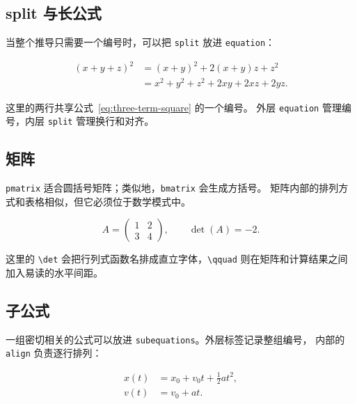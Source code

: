 \subsection{split 与长公式}

当整个推导只需要一个编号时，可以把 \texttt{split} 放进 \texttt{equation}：

\begin{equation}
\begin{split}
    (x+y+z)^2
        &= (x+y)^2+2(x+y)z+z^2 \\
        &= x^2+y^2+z^2+2xy+2xz+2yz.
\end{split}
\label{eq:three-term-square}
\end{equation}

这里的两行共享公式~\eqref{eq:three-term-square} 的一个编号。
外层 \texttt{equation} 管理编号，内层 \texttt{split} 管理换行和对齐。

\subsection{矩阵}

\texttt{pmatrix} 适合圆括号矩阵；类似地，\texttt{bmatrix} 会生成方括号。
矩阵内部的排列方式和表格相似，但它必须位于数学模式中。

\[
    A=
    \begin{pmatrix}
        1 & 2\\
        3 & 4
    \end{pmatrix},
    \qquad
    \det(A)=-2.
\]

这里的 \verb|\det| 会把行列式函数名排成直立字体，\verb|\qquad|
则在矩阵和计算结果之间加入易读的水平间距。

\subsection{子公式}

一组密切相关的公式可以放进 \texttt{subequations}。外层标签记录整组编号，
内部的 \texttt{align} 负责逐行排列：

\begin{subequations}\label{eq:newton-system}
\begin{align}
    x(t) &= x_0+v_0t+\frac{1}{2}at^2,\\
    v(t) &= v_0+at.
\end{align}
\end{subequations}

